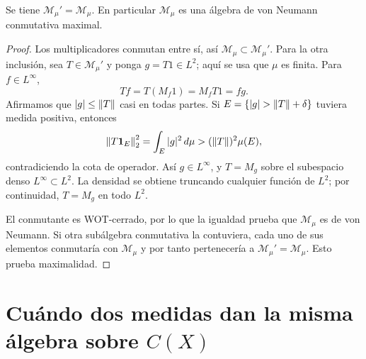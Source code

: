 \begin{teorema}\label{v3:masa-multiplicadores}
Se tiene $\mathcal M_\mu'=\mathcal M_\mu$. En particular $\mathcal M_\mu$ es una álgebra de von Neumann conmutativa maximal.
\end{teorema}
\begin{proof}
Los multiplicadores conmutan entre sí, así $\mathcal M_\mu\subset\mathcal M_\mu'$. Para la otra inclusión, sea $T\in\mathcal M_\mu'$ y ponga $g=T1\in L^2$; aquí se usa que $\mu$ es finita. Para $f\in L^\infty$,
\[
 Tf=T(M_f1)=M_fT1=fg.
\]
Afirmamos que $|g|\le\left\lVert T\right\rVert$ casi en todas partes. Si $E=\{|g|>\norm T+\delta\}$ tuviera medida positiva, entonces
\[
 \left\lVert T\mathbf1_E\right\rVert_2^2=\int_E|g|^2\,d\mu
 >(\left\lVert T\right\rVert)^2\mu(E),
\]
contradiciendo la cota de operador. Así $g\in L^\infty$, y $T=M_g$ sobre el subespacio denso $L^\infty\subset L^2$. La densidad se obtiene truncando cualquier función de $L^2$; por continuidad, $T=M_g$ en todo $L^2$.

El conmutante es WOT-cerrado, por lo que la igualdad prueba que $\mathcal M_\mu$ es de von Neumann. Si otra subálgebra conmutativa la contuviera, cada uno de sus elementos conmutaría con $\mathcal M_\mu$ y por tanto pertenecería a $\mathcal M_\mu'=\mathcal M_\mu$. Esto prueba maximalidad.
\end{proof}

\section{Cuándo dos medidas dan la misma álgebra sobre \texorpdfstring{$C(X)$}{C(X)}}

